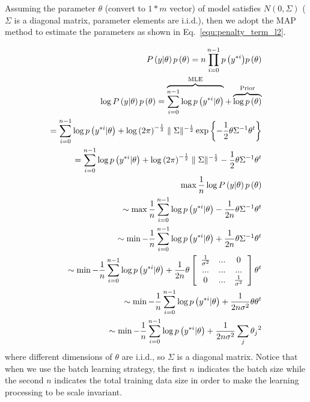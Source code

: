 \documentclass[runningheads,openany]{xhlPaper}
\begin{document}
Assuming the parameter $\theta$ (convert to $1*m$ vector) of model satisfies ${N\left( 0, \Sigma \right)}$ ($\Sigma$ is a diagonal matrix, parameter elements are i.i.d.), then we adopt the MAP method to estimate the parameters as shown in Eq.~\ref{equ:penalty_term_l2}.

\begin{equation}
\label{equ:penalty_term_l2}
\begin{aligned}
P\left( {y|\theta } \right)p\left( \theta  \right) = n\prod\limits_{i = 0}^{n - 1} {p\left( {{y^{*i}}} \right)} p\left( \theta  \right)\\
\log P\left( {y|\theta } \right)p\left( \theta  \right) = \overbrace {\sum\limits_{i = 0}^{n - 1} {\log p\left( {{y^{*i}}|\theta } \right)} }^{{\rm{MLE}}} + \overbrace {\log p\left( \theta  \right)}^{{\rm{Prior}}}\\
 = \sum\limits_{i = 0}^{n - 1} {\log p\left( {{y^{*i}}|\theta } \right)}  + \log {\left( {2\pi } \right)^{ - \frac{1}{2}}}\parallel \Sigma {\parallel ^{ - \frac{1}{2}}}\exp \left\{ { - \frac{1}{2}\theta {\Sigma ^{ - 1}}{\theta ^t}} \right\}\\
 = \sum\limits_{i = 0}^{n - 1} {\log p\left( {{y^{*i}}|\theta } \right)}  + \log {\left( {2\pi } \right)^{ - \frac{1}{2}}}\parallel \Sigma {\parallel ^{ - \frac{1}{2}}} - \frac{1}{2}\theta {\Sigma ^{ - 1}}{\theta ^t}\\
\max \frac{1}{n}\log P\left( {y|\theta } \right)p\left( \theta  \right)\\
 \sim \max \frac{1}{n}\sum\limits_{i = 0}^{n - 1} {\log p\left( {{y^{*i}}|\theta } \right)}  - \frac{1}{{2n}}\theta {\Sigma ^{ - 1}}{\theta ^t}\\
 \sim \min  - \frac{1}{n}\sum\limits_{i = 0}^{n - 1} {\log p\left( {{y^{*i}}|\theta } \right)}  + \frac{1}{{2n}}\theta {\Sigma ^{ - 1}}{\theta ^t}\\
 \sim \min  - \frac{1}{n}\sum\limits_{i = 0}^{n - 1} {\log p\left( {{y^{*i}}|\theta } \right)}  + \frac{1}{{2n}}\theta \left[ {\begin{array}{*{20}{c}}
{\frac{1}{{{\sigma ^2}}}}&{...}&0\\
{...}&{...}&{...}\\
0&{...}&{\frac{1}{{{\sigma ^2}}}}
\end{array}} \right]{\theta ^t}\\
 \sim \min  - \frac{1}{n}\sum\limits_{i = 0}^{n - 1} {\log p\left( {{y^{*i}}|\theta } \right)}  + \frac{1}{{2n{\sigma ^2}}}\theta {\theta ^t}\\
 \sim \min  - \frac{1}{n}\sum\limits_{i = 0}^{n - 1} {\log p\left( {{y^{*i}}|\theta } \right)}  + \frac{1}{{2n{\sigma ^2}}}\sum\limits_j {{\theta _j}^2} 
\end{aligned}
\end{equation}
where different dimensions of $\theta$ are i.i.d., so $\Sigma$ is a diagonal matrix.
Notice that when we use the batch learning strategy, the first $n$ indicates the batch size while the second $n$ indicates the total training data size in order to make the learning processing to be scale invariant.
\end{document}
